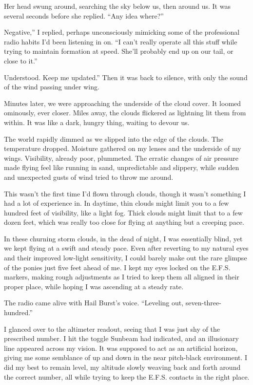 Her head swung around, searching the sky below us, then around us. It was several seconds before she replied. “Any idea where?”

\leavevmode{}Negative,” I replied, perhaps unconsciously mimicking some of the professional radio habits I’d been listening in on. “I can’t really operate all this stuff while trying to maintain formation at speed. She’ll probably end up on our tail, or close to it.”

\leavevmode{}Understood. Keep me updated.” Then it was back to silence, with only the sound of the wind passing under wing.

Minutes later, we were approaching the underside of the cloud cover. It loomed ominously, ever closer. Miles away, the clouds flickered as lightning lit them from within. It was like a dark, hungry thing, waiting to devour us.

The world rapidly dimmed as we slipped into the edge of the clouds. The temperature dropped. Moisture gathered on my lenses and the underside of my wings. Visibility, already poor, plummeted. The erratic changes of air pressure made flying feel like running in sand, unpredictable and slippery, while sudden and unexpected gusts of wind tried to throw me around.

This wasn’t the first time I’d flown through clouds, though it wasn’t something I had a lot of experience in. In daytime, thin clouds might limit you to a few hundred feet of visibility, like a light fog. Thick clouds might limit that to a few dozen feet, which was really too close for flying at anything but a creeping pace.

In these churning storm clouds, in the dead of night, I was essentially blind, yet we kept flying at a swift and steady pace. Even after reverting to my natural eyes and their improved low-light sensitivity, I could barely make out the rare glimpse of the ponies just five feet ahead of me. I kept my eyes locked on the E.F.S. markers, making rough adjustments as I tried to keep them all aligned in their proper place, while hoping I was ascending at a steady rate.

The radio came alive with Hail Burst’s voice. “Leveling out, seven-three-hundred.”

I glanced over to the altimeter readout, seeing that I was just shy of the prescribed number. I hit the toggle Sunbeam had indicated, and an illusionary line appeared across my vision. It was supposed to act as an artificial horizon, giving me some semblance of up and down in the near pitch-black environment. I did my best to remain level, my altitude slowly weaving back and forth around the correct number, all while trying to keep the E.F.S. contacts in the right place.

